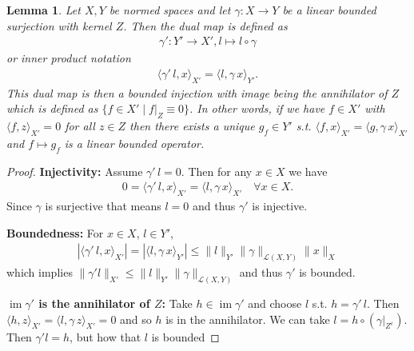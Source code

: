 \documentclass[12pt,a4paper]{article}
\numberwithin{equation}{subsection}
\newtheorem{lemma}{Lemma}[section]
\numberwithin{lemma}{subsection}
\theoremstyle{definition}
\DeclareMathOperator{\Ima}{im}
\begin{document}
\begin{lemma}\label{lem:dual_map_of_surjective_operator}
    Let $X, Y$ be normed spaces and let $\gamma: X \rightarrow Y$ be a 
    linear bounded surjection with kernel $Z$. Then the dual map is defined as
    \begin{align*}
        \gamma': Y' \rightarrow X', l \mapsto l \circ \gamma
    \end{align*}
    or inner product notation
    \begin{align*}
        \langle \gamma' \, l, x \rangle_{X'} = \langle l, \gamma\,x \rangle_{Y'}.
    \end{align*}
    This dual map is then a bounded injection with image 
    being the annihilator of $Z$ which is defined as 
    $\{ f \in X' \mid f|_Z \equiv 0 \}$. In other words, if we have $f \in X'$
    with $\langle f, z \rangle_{X'} = 0$ for all $z \in Z$ then there exists a unique 
    $g_f \in Y'$ s.t. $\langle f, x \rangle_{X'} = \langle g, \gamma \, x \rangle_{X'}$
    and $f \mapsto g_f$ is a linear bounded operator.
\end{lemma}
\begin{proof}
    \textbf{Injectivity:} Assume $\gamma' \, l = 0$. 
    Then for any $x \in X$ we have 
    \begin{align*}
        0 = \langle \gamma' \, l, x \rangle_{X'}
        = \langle l, \gamma\,x \rangle_{X'} \quad \forall x \in X.
    \end{align*}
    Since $\gamma$ is surjective that means $l = 0$ and thus $\gamma'$ is injective.

    \textbf{Boundedness:} For $x \in X$, $l \in Y'$,
    \begin{align*}
        | \langle \gamma'\,l, x \rangle_{X'} | 
        = | \langle l, \gamma \,x \rangle_{Y'} |
        \leq \lVert l \rVert _{Y'} \lVert \gamma \rVert _{\mathcal{L}(X,Y)} 
            \lVert x \rVert _X
    \end{align*}
    which implies $\lVert \gamma' l \rVert_{X'} \leq \lVert l \rVert _{Y'} \lVert \gamma \rVert _{\mathcal{L}(X,Y)}$
    and thus $\gamma'$ is bounded.

    \textbf{$\Ima \gamma'$ is the annihilator of $Z$:}
        Take $h \in \Ima \gamma'$ and choose $l$ s.t. $h = \gamma' \,l$.
        Then $\langle h, z \rangle_{X'} = \langle l, \gamma\, z \rangle_{X'} = 0$
        and so $h$ is in the annihilator.
        {\color{red} We can take $l = h \circ (\gamma|_{Z^c})$. Then
        $\gamma'l = h$, but how that $l$ is bounded}
\end{proof}
\end{document}
